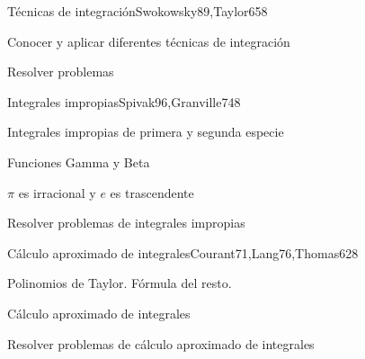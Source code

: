 \begin{syllabus}
\begin{unit}{Técnicas de integración}{Swokowsky89,Taylor65}{8}
\begin{learningoutcomes}
	\item Conocer y aplicar diferentes técnicas de integración
	\item Resolver problemas
\end{learningoutcomes}
\end{unit}

\begin{unit}{Integrales impropias}{Spivak96,Granville74}{8}
\begin{topics}
	\item Integrales impropias de primera y segunda especie
	\item Funciones Gamma y Beta
	\item $\pi$ es irracional y $e$ es trascendente
\end{topics}

\begin{learningoutcomes}
	\item Resolver problemas de integrales impropias
\end{learningoutcomes}
\end{unit}

\begin{unit}{Cálculo aproximado de integrales}{Courant71,Lang76,Thomas62}{8}
\begin{topics}
      \item Polinomios de Taylor. Fórmula del resto.
      \item Cálculo aproximado de integrales
  \end{topics}

   \begin{learningoutcomes}
      \item Resolver problemas de cálculo aproximado de integrales
   \end{learningoutcomes}
\end{unit}

\begin{coursebibliography}
\end{coursebibliography}
\end{syllabus}
